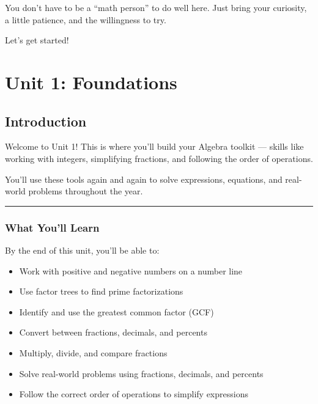 \documentclass[
  letterpaper,
  DIV=11,
  numbers=noendperiod]{scrreprt}
\providecommand{\tightlist}{%
  \setlength{\itemsep}{0pt}\setlength{\parskip}{0pt}}
\begin{document}
You don't have to be a ``math person'' to do well here. Just bring your
curiosity, a little patience, and the willingness to try.

Let's get started!

\part{Unit 1: Foundations}

\chapter*{Introduction}\label{introduction}


Welcome to Unit 1! This is where you'll build your Algebra toolkit ---
skills like working with integers, simplifying fractions, and following
the order of operations.

You'll use these tools again and again to solve expressions, equations,
and real-world problems throughout the year.

\begin{center}\rule{0.5\linewidth}{0.5pt}\end{center}

\section*{What You'll Learn}\label{what-youll-learn}


By the end of this unit, you'll be able to:

\begin{itemize}
\tightlist
\item
  Work with positive and negative numbers on a number line\\
\item
  Use factor trees to find prime factorizations\\
\item
  Identify and use the greatest common factor (GCF)\\
\item
  Convert between fractions, decimals, and percents\\
\item
  Multiply, divide, and compare fractions
\item
  Solve real-world problems using fractions, decimals, and percents
\item
  Follow the correct order of operations to simplify expressions
\end{itemize}
\end{document}
